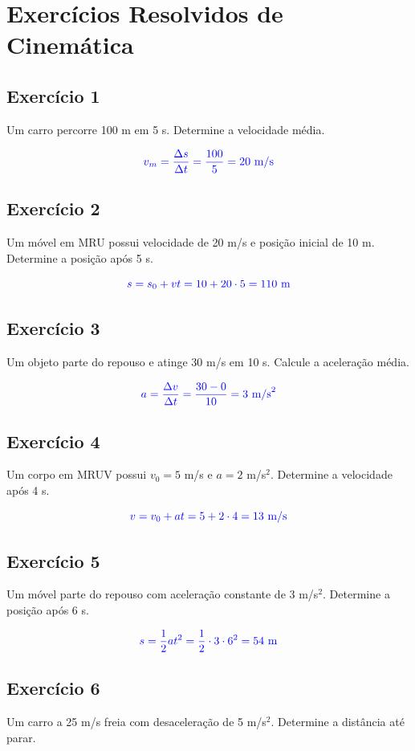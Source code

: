 \documentclass[a4paper,12pt]{article}
\begin{document}
\section{Exercícios Resolvidos de Cinemática}

\subsection*{Exercício 1}
Um carro percorre 100 m em 5 s. Determine a velocidade média.

\[
\textcolor{blue}{v_m = \frac{\Delta s}{\Delta t} = \frac{100}{5} = 20\ \text{m/s}}
\]

\subsection*{Exercício 2}
Um móvel em MRU possui velocidade de 20 m/s e posição inicial de 10 m. Determine a posição após 5 s.

\[
\textcolor{blue}{s = s_0 + vt = 10 + 20 \cdot 5 = 110\ \text{m}}
\]

\subsection*{Exercício 3}
Um objeto parte do repouso e atinge 30 m/s em 10 s. Calcule a aceleração média.

\[
\textcolor{blue}{a = \frac{\Delta v}{\Delta t} = \frac{30 - 0}{10} = 3\ \text{m/s}^2}
\]

\subsection*{Exercício 4}
Um corpo em MRUV possui $v_0 = 5$ m/s e $a = 2$ m/s$^2$. Determine a velocidade após 4 s.

\[
\textcolor{blue}{v = v_0 + at = 5 + 2 \cdot 4 = 13\ \text{m/s}}
\]

\subsection*{Exercício 5}
Um móvel parte do repouso com aceleração constante de 3 m/s$^2$. Determine a posição após 6 s.

\[
\textcolor{blue}{s = \frac{1}{2}at^2 = \frac{1}{2} \cdot 3 \cdot 6^2 = 54\ \text{m}}
\]

\subsection*{Exercício 6}
Um carro a 25 m/s freia com desaceleração de 5 m/s$^2$. Determine a distância até parar.
\end{document}
